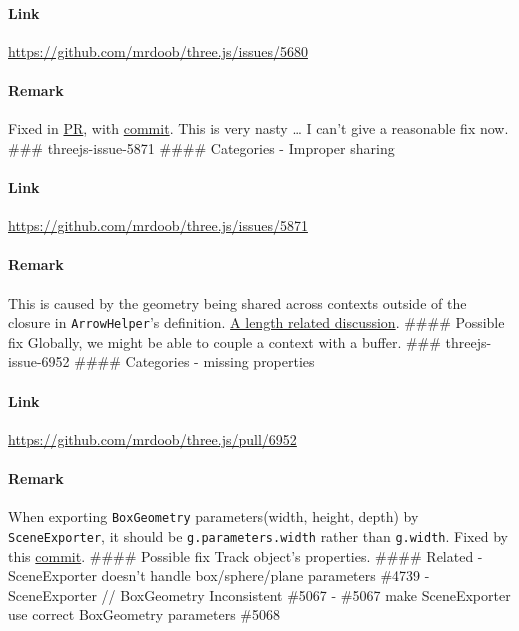 \paragraph{Link}\label{link-10}

\url{https://github.com/mrdoob/three.js/issues/5680}

\paragraph{Remark}\label{remark-10}

Fixed in \href{https://github.com/mrdoob/three.js/pull/5723}{PR}, with
\href{https://github.com/AVGP/three.js/commit/2518eaac07154bd466c4a7d18b819cc47f5ee0aa}{commit}.
This is very nasty \ldots{} I can't give a reasonable fix now. \#\#\#
threejs-issue-5871 \#\#\#\# Categories - Improper sharing

\paragraph{Link}\label{link-11}

\url{https://github.com/mrdoob/three.js/issues/5871}

\paragraph{Remark}\label{remark-11}

This is caused by the geometry being shared across contexts outside of
the closure in \texttt{ArrowHelper}'s definition.
\href{https://github.com/mrdoob/three.js/pull/6723}{A length related
discussion}. \#\#\#\# Possible fix Globally, we might be able to couple
a context with a buffer. \#\#\# threejs-issue-6952 \#\#\#\# Categories -
missing properties

\paragraph{Link}\label{link-12}

\url{https://github.com/mrdoob/three.js/pull/6952}

\paragraph{Remark}\label{remark-12}

When exporting \texttt{BoxGeometry} parameters(width, height, depth) by
\texttt{SceneExporter}, it should be \texttt{g.parameters.width} rather
than \texttt{g.width}. Fixed by this
\href{https://github.com/dubejf/three.js/commit/b5b79a7a6aa4b42846f89e4852f36719543a3438}{commit}.
\#\#\#\# Possible fix Track object's properties. \#\#\#\# Related -
SceneExporter doesn't handle box/sphere/plane parameters \#4739 -
SceneExporter // BoxGeometry Inconsistent \#5067 - \#5067 make
SceneExporter use correct BoxGeometry parameters \#5068

